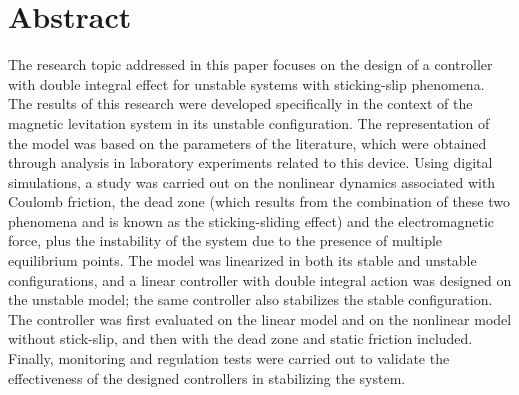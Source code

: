 \chapter{Abstract}\label{Chap:Abstract}

The research topic addressed in this paper focuses on the design of a controller with double integral effect for unstable systems with sticking-slip phenomena. The results of this research were developed specifically in the context of the magnetic levitation system in its unstable configuration. The representation of the model was based on the parameters of the literature, which were obtained through analysis in laboratory experiments related to this device. Using digital simulations, a study was carried out on the nonlinear dynamics associated with Coulomb friction, the dead zone (which results from the combination of these two phenomena and is known as the sticking-sliding effect) and the electromagnetic force, plus the instability of the system due to the presence of multiple equilibrium points. The model was linearized in both its stable and unstable configurations, and a linear controller with double integral action was designed on the unstable model; the same controller also stabilizes the stable configuration. The controller was first evaluated on the linear model and on the nonlinear model without stick-slip, and then with the dead zone and static friction included. Finally, monitoring and regulation tests were carried out to validate the effectiveness of the designed controllers in stabilizing the system.